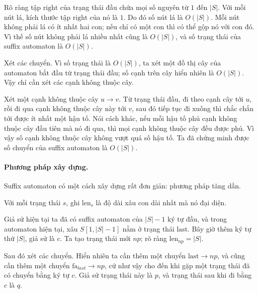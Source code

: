 \documentclass[11pt]{article}
\begin{document}
Rõ ràng tập \(\mathrm{right}\) của trạng thái đầu chứa mọi số nguyên từ \(1\)
đến \(|S|\). Với mỗi nút lá, kích thước tập \(\mathrm{right}\) của nó là \(1\).
Do đó số nút lá là \(O(|S|)\). Mỗi nút không phải lá có ít nhất hai con; nếu chỉ
có một con thì có thể gộp nó với con đó. Vì thế số nút không phải lá nhiều nhất
cũng là \(O(|S|)\), và số trạng thái của suffix automaton là \(O(|S|)\).

Xét các chuyển. Vì số trạng thái là \(O(|S|)\), ta xét một đồ thị cây của
automaton bắt đầu từ trạng thái đầu; số cạnh trên cây hiển nhiên là
\(O(|S|)\). Vậy chỉ cần xét các cạnh không thuộc cây.

Xét một cạnh không thuộc cây \(u\to v\). Từ trạng thái đầu, đi theo cạnh cây
tới \(u\), rồi đi qua cạnh không thuộc cây này tới \(v\), sau đó tiếp tục đi
xuống thì chắc chắn tới được ít nhất một hậu tố. Nói cách khác, nếu mỗi hậu tố
phủ cạnh không thuộc cây đầu tiên mà nó đi qua, thì mọi cạnh không thuộc cây
đều được phủ. Vì vậy số cạnh không thuộc cây không vượt quá số hậu tố. Ta đã
chứng minh được số chuyển của suffix automaton là \(O(|S|)\).

\paragraph{Phương pháp xây dựng.}
Suffix automaton có một cách xây dựng rất đơn giản: phương pháp tăng dần.

Với mỗi trạng thái \(s\), ghi \(\mathrm{len}_s\) là độ dài xâu con dài nhất mà
nó đại diện.

Giả sử hiện tại ta đã có suffix automaton của \(|S|-1\) ký tự đầu, và trong
automaton hiện tại, xâu \(S[1,|S|-1]\) nằm ở trạng thái \(\mathrm{last}\). Bây
giờ thêm ký tự thứ \(|S|\), giả sử là \(c\). Ta tạo trạng thái mới \(np\); rõ
ràng \(\mathrm{len}_{np}=|S|\).

Sau đó xét các chuyển. Hiển nhiên ta cần thêm một chuyển
\(\mathrm{last}\to np\), và cũng cần thêm một chuyển \(\mathrm{fa}_{last}\to
np\), cứ như vậy cho đến khi gặp một trạng thái đã có chuyển bằng ký tự \(c\).
Giả sử trạng thái này là \(p\), và trạng thái sau khi đi bằng \(c\) là \(q\).
\end{document}
